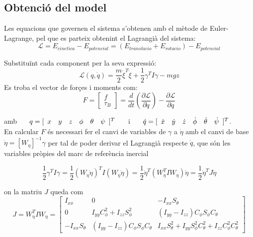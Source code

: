 \documentclass[twoside]{article}
\begin{document}
\subsection{Obtenció del model}
Les equacions que governen el sistema s'obtenen amb el mètode de Euler-Lagrange, pel que es parteix obtenint el Lagrangià del sistema:
\begin{equation}
\mathcal{L}=E_{cinetica} - E_{potencial} = (E_{translacio}+E_{rotacio})-E_{potencial}
\end{equation}

Substituïnt cada component per la seva expressió:
\begin{equation}
\mathcal{L}(q,\dot{q})=\frac{m}{2} \dot{\xi}^T \dot{\xi} + \frac{1}{2}\gamma^{T}I\gamma - mgz
\end{equation}
Es troba el vector de forçes i moments com:
\begin{equation}
F=\left[ \begin{array}{c}
f \\
\tau_B
\end{array} \right] = \frac{d}{dt}\left(\frac{\partial \mathcal{L}}{\partial \dot{q}}\right)-\frac{\partial\mathcal{L}}{\partial q}
\end{equation}

amb $ \hspace{0.5cm} q=[\begin{array}{cccccc}
x & y & z & \phi & \theta & \psi
\end{array} ]^{T} \hspace{0.5cm}$ i $ \hspace{0.5cm} \dot{q}=[\begin{array}{cccccc}
\dot{x} & \dot{y} & \dot{z} & \dot{\phi} & \dot{\theta} & \dot{\psi}
\end{array} ]^{T}$.\\

En calcular $F$ és necessari fer el canvi de variables de $\gamma$ a $\dot{\eta}$ amb el canvi de base $\dot{\eta}=\left[ W_\eta \right]^{-1} \gamma$ per tal de poder derivar el Lagrangià respecte $\dot{q}$, que són les variables pròpies del marc de referència inercial

\begin{equation}
\frac{1}{2}\gamma^{T}I\gamma = \frac{1}{2}(W_\eta \dot{\eta})^{T}I(W_\eta \dot{\eta}) = \frac{1}{2}\dot{\eta}^{T}(W_\eta ^{T}IW_\eta)\dot{\eta} = \frac{1}{2}\dot{\eta}^{T}J\dot{\eta}
\end{equation}

on la matriu $J$ queda com
\begin{equation}
J=W_\eta ^{T}IW_\eta = \left[ \begin{array}{ccc}
I_{xx} & 0 & -I_{xx} S_\theta \\
0 & I_{yy} C^2_\phi + I_{zz} S^2_\phi & (I_{yy}-I_{zz}) C_{\phi} S_\phi C_\theta \\
-I_{xx} S_\theta & (I_{yy}-I_{zz}) C_{\phi} S_\phi C_\theta & I_{xx} S^2_{\theta}+I_{yy} S^2_{\phi} C^2_\theta +I_{zz}C^2_{\phi} C^2_{\theta}
\end{array} \right]
\end{equation} 
\end{document}
